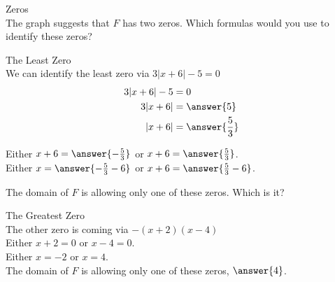 \documentclass{ximera}
\begin{document}
\begin{exercise} Zeros \\

The graph suggests that $F$ has two zeros.  Which formulas would you use to identify these zeros?

\begin{selectAll}
\end{selectAll}

\end{exercise}




\begin{exercise} The Least Zero \\

We can identify the least zero via $3|x+6| - 5 = 0$ \\



\begin{align*}
3|x+6| - 5       &=      0 \\
3|x+6|  &= \answer{5} \\
|x+6|   &= \answer{\frac{5}{3}} \\
\end{align*}

Either  $x+6 = \answer{-\frac{5}{3}}$   or  $x+6 = \answer{\frac{5}{3}}$.  \\


Either  $x = \answer{-\frac{5}{3}-6}$   or  $x+6 = \answer{\frac{5}{3}-6}$. 

The domain of $F$ is allowing only one of these zeros. Which is it?


\begin{multipleChoice}
\end{multipleChoice}



\end{exercise}








\begin{exercise} The Greatest Zero \\

The other zero is coming via $-(x+2)(x-4)$ \\



Either  $x+2 = 0$   or  $x-4 = 0$.  \\


Either  $x = -2$   or  $x = 4$.  \\

The domain of $F$ is allowing only one of these zeros, $\answer{4}$.


\end{exercise}
\end{document}
